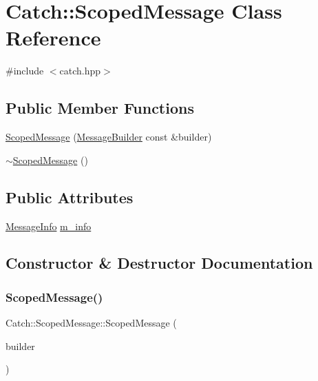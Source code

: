 \hypertarget{classCatch_1_1ScopedMessage}{}\section{Catch\+:\+:Scoped\+Message Class Reference}
\label{classCatch_1_1ScopedMessage}


{\ttfamily \#include $<$catch.\+hpp$>$}

\subsection*{Public Member Functions}
\begin{DoxyCompactItemize}
\item 
\mbox{\hyperlink{classCatch_1_1ScopedMessage_a5cc59f0f2ebe840e6607f83004d49a17}{Scoped\+Message}} (\mbox{\hyperlink{structCatch_1_1MessageBuilder}{Message\+Builder}} const \&builder)
\item 
\mbox{\hyperlink{classCatch_1_1ScopedMessage_a43190843f9eeb84a0b42b0bc95fdf93a}{$\sim$\+Scoped\+Message}} ()
\end{DoxyCompactItemize}
\subsection*{Public Attributes}
\begin{DoxyCompactItemize}
\item 
\mbox{\hyperlink{structCatch_1_1MessageInfo}{Message\+Info}} \mbox{\hyperlink{classCatch_1_1ScopedMessage_ae6e1476f389cc6e1586f033b3747b27b}{m\+\_\+info}}
\end{DoxyCompactItemize}


\subsection{Constructor \& Destructor Documentation}
\mbox{\label{classCatch_1_1ScopedMessage_a5cc59f0f2ebe840e6607f83004d49a17}} 
\subsubsection{\texorpdfstring{Scoped\+Message()}{ScopedMessage()}}
{\footnotesize\ttfamily Catch\+::\+Scoped\+Message\+::\+Scoped\+Message (\begin{DoxyParamCaption}\item[{\mbox{\hyperlink{structCatch_1_1MessageBuilder}{Message\+Builder}} const \&}]{builder }\end{DoxyParamCaption})}

